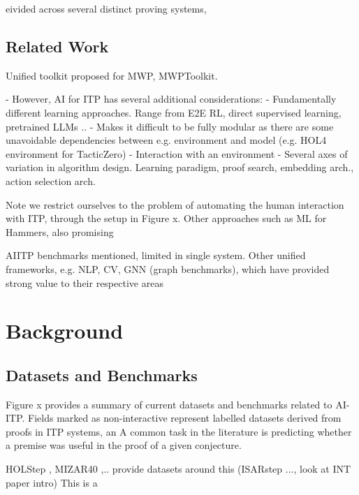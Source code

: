 \documentclass[letterpaper]{article} %
\begin{document}
    eivided across several distinct proving systems,





    \subsection{Related Work}
    Unified toolkit proposed for MWP, MWPToolkit.

    - However, AI for ITP has several additional considerations:
    - Fundamentally different learning approaches. Range from E2E RL, direct supervised learning, pretrained LLMs ..
    - Makes it difficult to be fully modular as there are some unavoidable dependencies between e.g. environment and
    model (e.g. HOL4 environment for TacticZero)
    - Interaction with an environment
    - Several axes of variation in algorithm design. Learning paradigm, proof search, embedding arch., action selection
    arch.

    Note we restrict ourselves to the problem of automating the human interaction with ITP, through the setup in Figure x.
    Other approaches such as ML for Hammers, also promising

    AIITP benchmarks mentioned, limited in single system.
    Other unified frameworks, e.g. NLP, CV, GNN (graph benchmarks), which have provided strong value to their respective areas


    \section{Background}

    \subsection{Datasets and Benchmarks}

    Figure x provides a summary of current datasets and benchmarks related to AI-ITP.
    Fields marked as non-interactive represent labelled datasets derived from proofs in ITP systems, an
    A common task in the literature is predicting whether a premise was useful in the proof of a given conjecture.

    HOLStep \cite{kaliszyk_holstep_2017}, MIZAR40 \cite{kaliszyk_mizar_2015},.. provide datasets around this (ISARstep ..., look at INT paper intro)
    This is a
\end{document}
